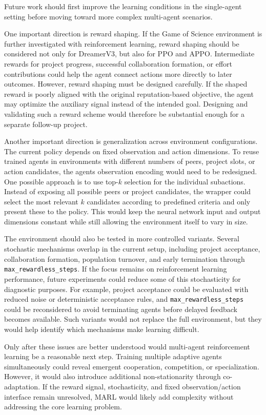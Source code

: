 \documentclass[english,bachelor]{hsluthesis}
\begin{document}
Future work should first improve the learning conditions in the single-agent setting before moving toward more complex multi-agent scenarios.

One important direction is reward shaping. If the Game of Science environment is further investigated with reinforcement learning, reward shaping should be considered not only for DreamerV3, but also for PPO and APPO. Intermediate rewards for project progress, successful collaboration formation, or effort contributions could help the agent connect actions more directly to later outcomes. However, reward shaping must be designed carefully. If the shaped reward is poorly aligned with the original reputation-based objective, the agent may optimize the auxiliary signal instead of the intended goal. Designing and validating such a reward scheme would therefore be substantial enough for a separate follow-up project.

Another important direction is generalization across environment configurations. The current policy depends on fixed observation and action dimensions. To reuse trained agents in environments with different numbers of peers, project slots, or action candidates, the agents observation encoding would need to be redesigned. One possible approach is to use top-$k$ selection for the individual subactions. Instead of exposing all possible peers or project candidates, the wrapper could select the most relevant $k$ candidates according to predefined criteria and only present these to the policy. This would keep the neural network input and output dimensions constant while still allowing the environment itself to vary in size.

The environment should also be tested in more controlled variants. Several stochastic mechanisms overlap in the current setup, including project acceptance, collaboration formation, population turnover, and early termination through \texttt{max\_rewardless\_steps}. If the focus remains on reinforcement learning performance, future experiments could reduce some of this stochasticity for diagnostic purposes. For example, project acceptance could be evaluated with reduced noise or deterministic acceptance rules, and \texttt{max\_rewardless\_steps} could be reconsidered to avoid terminating agents before delayed feedback becomes available. Such variants would not replace the full environment, but they would help identify which mechanisms make learning difficult.

Only after these issues are better understood would multi-agent reinforcement learning be a reasonable next step. Training multiple adaptive agents simultaneously could reveal emergent cooperation, competition, or specialization. However, it would also introduce additional non-stationarity through co-adaptation. If the reward signal, stochasticity, and fixed observation/action interface remain unresolved, MARL would likely add complexity without addressing the core learning problem.
\end{document}
